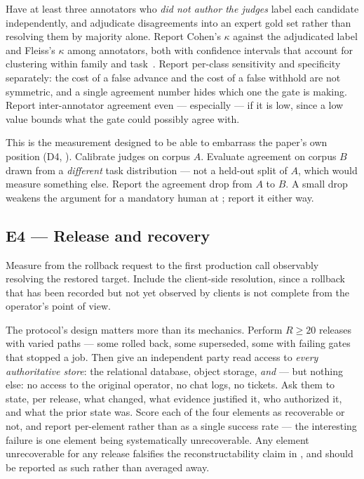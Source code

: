Have at least three annotators who \emph{did not author the judges} label each
candidate independently, and adjudicate disagreements into an expert gold set
rather than resolving them by majority alone. Report Cohen's $\kappa$ against the
adjudicated label and Fleiss's $\kappa$ among annotators, both with confidence
intervals that account for clustering within family and
task~\cite{cohen1960kappa,fleiss1971kappa}. Report per-class sensitivity and
specificity separately: the cost of a false advance and the cost of a false
withhold are not symmetric, and a single agreement number hides which one the gate
is making. Report inter-annotator agreement even --- especially --- if it is low,
since a low value bounds what the gate could possibly agree with.

 This is the measurement designed to be able
to embarrass the paper's own position (D4, ). Calibrate judges on
corpus $A$. Evaluate agreement on corpus $B$ drawn from a \emph{different} task
distribution --- not a held-out split of $A$, which would measure something else.
Report the agreement drop from $A$ to $B$. A small drop weakens the argument for a
mandatory human at ; report it either way.

\subsection{E4 --- Release and recovery}

 Measure from the rollback request to the first
production call observably resolving the restored target. Include the client-side
resolution, since a rollback that has been recorded but not yet observed by clients
is not complete from the operator's point of view.

 The protocol's design matters more than its
mechanics. Perform $R \geq 20$ releases with varied paths --- some rolled back, some
superseded, some with failing gates that stopped a job. Then give an independent
party read access to \emph{every authoritative store}: the relational database,
object storage, \emph{and} \mlflow{} --- but nothing else: no access to the
original operator, no chat logs, no tickets. Ask them to state, per release, what
changed, what evidence justified it, who authorized it, and what the prior state
was. Score each of the four elements as recoverable or not, and report per-element
rather than as a single success rate --- the interesting failure is one element
being systematically unrecoverable. Any element unrecoverable for any release
falsifies the reconstructability claim in , and should be
reported as such rather than averaged away.

